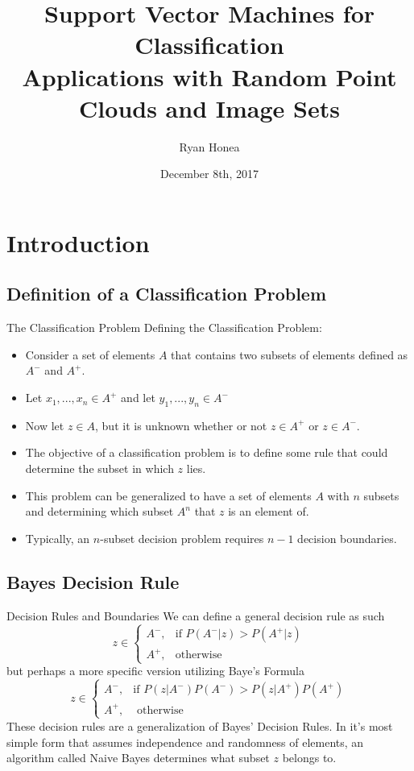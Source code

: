 \documentclass{beamer}
\author{Ryan Honea}
\title[SVM For Classification]{Support Vector Machines for Classification \\ \large Applications with Random Point Clouds and Image Sets}
\institute{Austin Peay State University}
\date{December 8th, 2017}
\begin{document}
\begin{frame}
\titlepage
\end{frame}

\begin{frame}[allowframebreaks]
\tableofcontents
\end{frame}

\section{Introduction}

\subsection{Definition of a Classification Problem}
\begin{frame}{The Classification Problem}
Defining the Classification Problem:

\begin{itemize}
\item Consider a set of elements $A$ that contains two subsets of elements defined as $A^-$ and $A^+$.
\item Let $x_1, ..., x_n \in A^+$ and let $y_1, ..., y_n \in A^-$
\item Now let $z \in A$, but it is unknown whether or not $z \in A^+$ or $z \in A^-$.
\item The objective of a classification problem is to define some rule that could determine the subset in which $z$ lies.
\item This problem can be generalized to have a set of elements $A$ with $n$ subsets and determining which subset $A^n$ that $z$ is an element of.
\item Typically, an $n$-subset decision problem requires $n-1$ decision boundaries.
\end{itemize}
\end{frame}

\subsection{Bayes Decision Rule}
\begin{frame}{Decision Rules and Boundaries}
We can define a general decision rule as such
$$z \in \begin{cases}A^-,& \text{if }P(A^-|z) > P(A^+|z)\\
A^+,& \text{otherwise}\end{cases}$$
but perhaps a more specific version utilizing Baye's Formula
$$z \in \begin{cases}
A^-, & \text{if } P(z|A^-)P(A^-) > P(z|A^+)P(A^+)\\
A^+, & \text{ otherwise}
\end{cases}$$
These decision rules are a generalization of Bayes' Decision Rules. In it's most simple form that assumes independence and randomness of elements, an algorithm called Naive Bayes determines what subset $z$ belongs to.
\end{frame}
\end{document}

